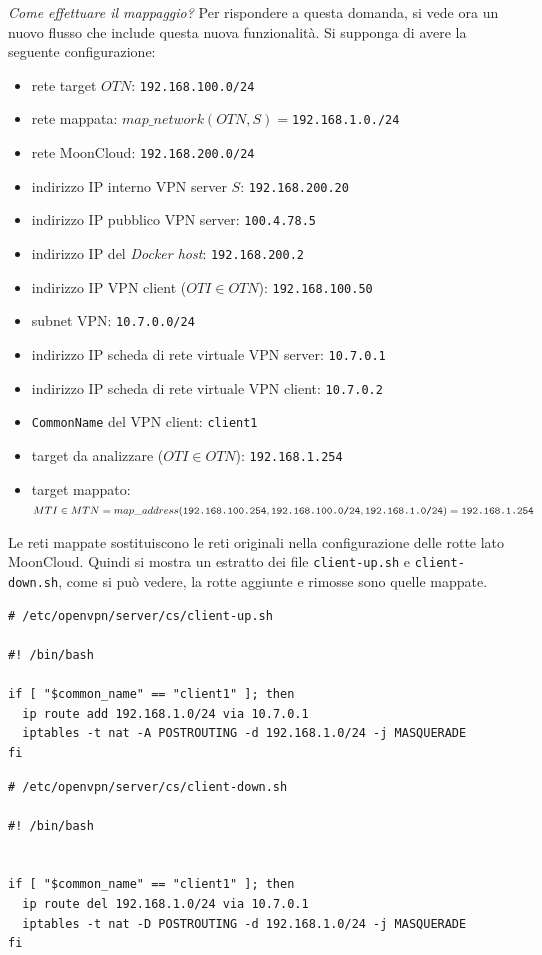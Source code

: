 \textit{Come effettuare il mappaggio?} Per rispondere a questa domanda, si vede ora
un nuovo flusso che include questa nuova funzionalità.
Si supponga di avere la seguente configurazione:
\begin{itemize}
  \item rete target $OTN$: \texttt{192.168.100.0/24}
  \item rete mappata: $map\_network(OTN, S)=$\texttt{192.168.1.0./24}
  \item rete MoonCloud: \texttt{192.168.200.0/24}
  \item indirizzo IP interno VPN server $S$: \texttt{192.168.200.20}
  \item indirizzo IP pubblico VPN server: \texttt{100.4.78.5}
  \item indirizzo IP del \textit{Docker host}: \texttt{192.168.200.2}
  \item indirizzo IP VPN client ($OTI \in OTN$): \texttt{192.168.100.50}
  \item subnet VPN: \texttt{10.7.0.0/24}
  \item indirizzo IP scheda di rete virtuale VPN server: \texttt{10.7.0.1}
  \item indirizzo IP scheda di rete virtuale VPN client: \texttt{10.7.0.2}
  \item \texttt{CommonName} del VPN client: \texttt{client1}
  \item target da analizzare ($OTI \in OTN$): \texttt{192.168.1.254}
  \item target mappato: $MTI \in MTN=map\_address(\texttt{192.168.100.254},\\
  \texttt{192.168.100.0/24},
  \texttt{192.168.1.0/24})=\texttt{192.168.1.254}$
\end{itemize}
Le reti mappate sostituiscono le reti originali nella configurazione delle rotte lato
MoonCloud. Quindi si mostra un estratto dei file \texttt{client-up.sh} e
\texttt{client-down.sh}, come si può vedere, la rotte aggiunte e rimosse sono
quelle mappate.
\begin{verbatim}
# /etc/openvpn/server/cs/client-up.sh

#! /bin/bash

if [ "$common_name" == "client1" ]; then
  ip route add 192.168.1.0/24 via 10.7.0.1
  iptables -t nat -A POSTROUTING -d 192.168.1.0/24 -j MASQUERADE
fi
\end{verbatim}
\begin{verbatim}
# /etc/openvpn/server/cs/client-down.sh

#! /bin/bash


if [ "$common_name" == "client1" ]; then
  ip route del 192.168.1.0/24 via 10.7.0.1
  iptables -t nat -D POSTROUTING -d 192.168.1.0/24 -j MASQUERADE
fi
\end{verbatim}
